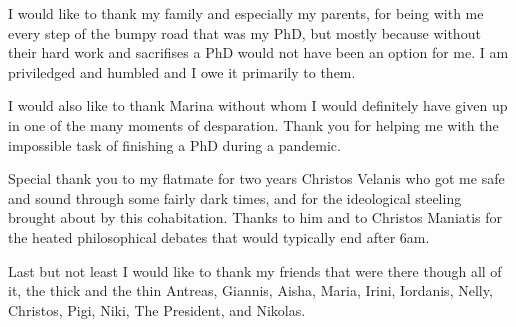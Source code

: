 \begin{precontent}
I would like to thank my family and especially my parents, for being
with me every step of the bumpy road that was my PhD, but mostly
because without their hard work and sacrifises a PhD would not have
been an option for me. I am priviledged and humbled and I owe it
primarily to them.

I would also like to thank Marina without whom I would definitely have
given up in one of the many moments of desparation. Thank you for
helping me with the impossible task of finishing a PhD during a
pandemic.

Special thank you to my flatmate for two years Christos Velanis who
got me safe and sound through some fairly dark times, and for the
ideological steeling brought about by this cohabitation. Thanks to him
and to Christos Maniatis for the heated philosophical debates that
would typically end after 6am.

Last but not least I would like to thank my friends that were there
though all of it, the thick and the thin Antreas, Giannis, Aisha,
Maria, Irini, Iordanis, Nelly, Christos, Pigi, Niki, The President,
and Nikolas.






\end{precontent}


\tableofcontents

\cleardoublepage
{}
{}
\listoffigures
\listoflistings

\cleardoublepage%
